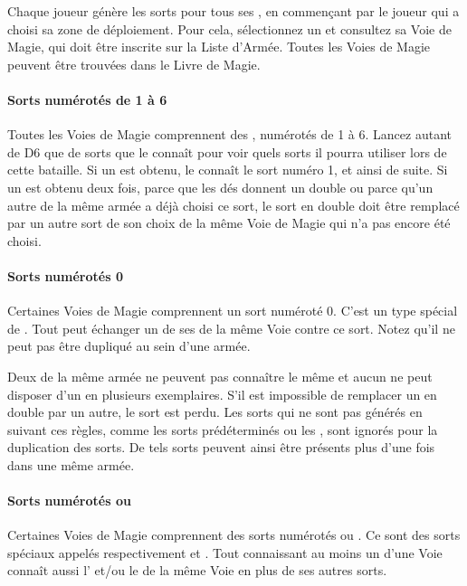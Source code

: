 Chaque joueur génère les sorts pour tous ses \wizards{}, en commençant par le joueur qui a choisi sa zone de déploiement. Pour cela, sélectionnez un \wizard{} et consultez sa Voie de Magie, qui doit être inscrite sur la Liste d'Armée. Toutes les Voies de Magie peuvent être trouvées dans le Livre de Magie.

\paragraph{Sorts numérotés de 1 à 6}

Toutes les Voies de Magie comprennent des \og \learnedspells{} \fg{}, numérotés de 1 à 6. Lancez autant de D6 que de sorts que le \wizard{} connaît pour voir quels sorts il pourra utiliser lors de cette bataille. Si un  est obtenu, le \wizard{} connaît le sort numéro 1, et ainsi de suite. Si un \learnedspell{} est obtenu deux fois, parce que les dés donnent un double ou parce qu'un autre \wizard{} de la même armée a déjà choisi ce sort, le sort en double doit être remplacé par un autre sort de son choix de la même Voie de Magie qui n'a pas encore été choisi.

\paragraph{Sorts numérotés 0}

Certaines Voies de Magie comprennent un sort numéroté 0. C'est un type spécial de \learnedspell{}. Tout \wizard{} peut échanger un de ses \learnedspells{} de la même Voie contre ce sort. Notez qu'il ne peut pas être dupliqué au sein d'une armée.

Deux \wizards{} de la même armée ne peuvent pas connaître le même \learnedspell{} et aucun \wizard{} ne peut disposer d'un \learnedspell{} en plusieurs exemplaires. S'il est impossible de remplacer un \learnedspell{} en double par un autre, le sort est perdu. Les sorts qui ne sont pas générés en suivant ces règles, comme les sorts prédéterminés ou les \boundspells{}, sont ignorés pour la duplication des sorts. De tels sorts peuvent ainsi être présents plus d'une fois dans une même armée.

\paragraph{Sorts numérotés \og \attributespellnumber{} \fg{} ou \og \traitspellnumber{} \fg{}}

Certaines Voies de Magie comprennent des sorts numérotés \og \attributespellnumber{} \fg{} ou \og \traitspellnumber{} \fg{}. Ce sont des sorts spéciaux appelés respectivement \attributespells{} et \traitspells{}. Tout \wizard{} connaissant au moins un \learnedspell{} d'une Voie connaît aussi l'\attributespell{} et/ou le \traitspell{} de la même Voie en plus de ses autres sorts.
